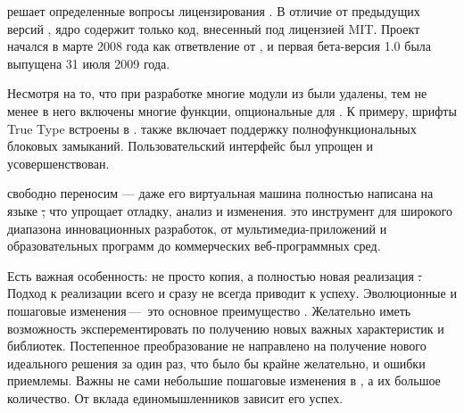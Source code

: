 \documentclass[a4paper,10pt,twoside]{book}
\begin{document}
\pharo решает определенные вопросы лицензирования \squeak. В отличие от предыдущих версий \squeak, ядро \pharo содержит только код, внесенный под лицензией MIT. Проект \pharo начался в марте 2008 года как ответвление от , и первая бета-версия 1.0 была выпущена 31 июля 2009 года.


Несмотря на то, что при разработке \pharo многие модули из \squeak были удалены, тем не менее в него включены многие функции, опциональные для \squeak. К примеру, шрифты True Type встроены в \pharo. \pharo также включает поддержку полнофункциональных блоковых замыканий. Пользовательский интерфейс был упрощен и усовершенствован.


\pharo свободно переносим --- даже его виртуальная машина полностью написана на языке \st, что упрощает отладку, анализ и изменения. \pharo это инструмент для широкого диапазона инновационных разработок, от мультимедиа-приложений и образовательных программ до коммерческих веб-программных сред. 


Есть важная особенность: \pharo не просто копия, а полностью новая реализация \st. Подход к реализации всего и сразу не всегда приводит к успеху. Эволюционные и пошаговые изменения\,---\, это основное преимущество \pharo. Желательно иметь возможность эксперементировать по получению новых важных характеристик и библиотек. Постепенное преобразование \pharo не направлено на получение нового идеального решения за один раз, что было бы крайне желательно, и ошибки приемлемы. Важны не сами небольшие пошаговые изменения в \pharo, а их большое количество. От вклада единомышленников \pharo зависит его успех.
\end{document}
